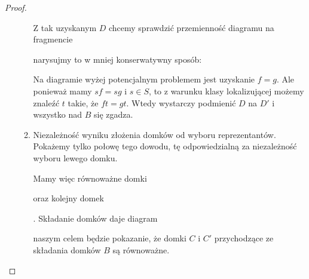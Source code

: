 \begin{proof}
\begin{enumerate}
\begin{enumerate}
      Z tak uzyskanym $D$ chcemy sprawdzić przemienność diagramu na fragmencie 
      \begin{center}\end{center}
      narysujmy to w mniej konserwatywny sposób:
      \begin{center}\end{center}
      Na diagramie wyżej potencjalnym problemem jest uzyskanie $f=g$. Ale ponieważ mamy $sf=sg$ i $s\in S$, to z warunku klasy lokalizującej możemy znaleźć $t$ takie, że $ft=gt$. Wtedy wystarczy podmienić $D$ na $D'$ i wszystko nad $B$ się zgadza.
    \item Niezależność wyniku złożenia domków od wyboru reprezentantów. Pokażemy tylko połowę tego dowodu, tę odpowiedzialną za niezależność wyboru lewego domku.

      Mamy więc równoważne domki
      \begin{center}\end{center}
      oraz kolejny domek . Składanie domków daje diagram
      \begin{center}\end{center}
      naszym celem będzie pokazanie, że domki $C$ i $C'$ przychodzące ze składania domków $B$ są równoważne.


\end{enumerate}
\end{enumerate}
\end{proof}
